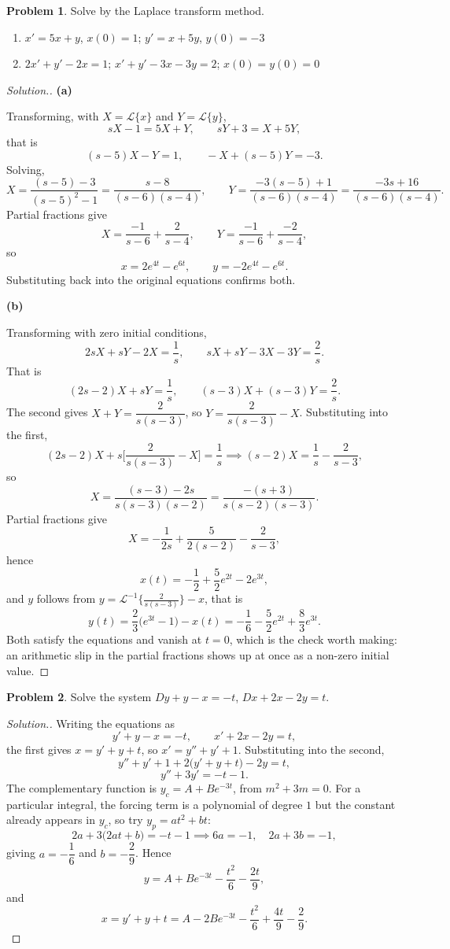 \documentclass[11pt,a4paper]{article}
\theoremstyle{definition}
\newtheorem{problemx}{Problem}[subsection]
\newenvironment{problem}{\begin{problemx}}{\end{problemx}}
\newenvironment{solution}
  {\renewcommand{\qedsymbol}{}\begin{proof}[\textit{Solution}.]}
  {\end{proof}}
\newcommand{\subhead}[1]{%
  \par\medskip\noindent\textbf{#1}\par\nobreak\smallskip}
\begin{document}
\begin{problem}
Solve by the Laplace transform method.
\begin{enumerate}
\item[(a)] $x' = 5x+y$, $x(0)=1$; $y' = x+5y$, $y(0)=-3$
\item[(b)] $2x'+y'-2x = 1$; $x'+y'-3x-3y = 2$; $x(0)=y(0)=0$
\end{enumerate}
\end{problem}
\begin{solution}
\subhead{(a)}
Transforming, with $X = \mathcal{L}\{x\}$ and $Y = \mathcal{L}\{y\}$,
$$sX-1 = 5X+Y,\qquad sY+3 = X+5Y ,$$
that is
$$(s-5)X - Y = 1,\qquad -X + (s-5)Y = -3 .$$
Solving,
$$X = \frac{(s-5)-3}{(s-5)^2-1} = \frac{s-8}{(s-6)(s-4)},\qquad
Y = \frac{-3(s-5)+1}{(s-6)(s-4)} = \frac{-3s+16}{(s-6)(s-4)}.$$
Partial fractions give
$$X = \frac{-1}{s-6} + \frac{2}{s-4},\qquad
Y = \frac{-1}{s-6} + \frac{-2}{s-4},$$
so
$$x = 2e^{4t}-e^{6t},\qquad y = -2e^{4t}-e^{6t}.$$
Substituting back into the original equations confirms both.

\subhead{(b)}
Transforming with zero initial conditions,
$$2sX + sY - 2X = \frac1s,\qquad sX+sY-3X-3Y = \frac2s .$$
That is
$$(2s-2)X + sY = \frac1s,\qquad (s-3)X + (s-3)Y = \frac2s .$$
The second gives $X+Y = \dfrac{2}{s(s-3)}$, so $Y = \dfrac{2}{s(s-3)} - X$.
Substituting into the first,
$$(2s-2)X + s\Big[\frac{2}{s(s-3)}-X\Big] = \frac1s
\implies (s-2)X = \frac1s - \frac{2}{s-3},$$
so
$$X = \frac{(s-3)-2s}{s(s-3)(s-2)} = \frac{-(s+3)}{s(s-2)(s-3)} .$$
Partial fractions give
$$X = -\frac{1}{2s} + \frac{5}{2(s-2)} - \frac{2}{s-3},$$
hence
$$x(t) = -\frac12 + \frac52e^{2t} - 2e^{3t},$$
and $y$ follows from $y = \displaystyle\mathcal{L}^{-1}\Big\{\frac{2}{s(s-3)}\Big\} - x$,
that is
$$y(t) = \frac23\big(e^{3t}-1\big) - x(t)
= -\frac16 - \frac52e^{2t} + \frac83e^{3t}.$$
Both satisfy the equations and vanish at $t=0$, which is the check worth
making: an arithmetic slip in the partial fractions shows up at once as a
non-zero initial value.
\end{solution}

\begin{problem}
Solve the system $Dy+y-x = -t$, $Dx+2x-2y = t$.
\end{problem}
\begin{solution}
Writing the equations as
$$y'+y-x = -t,\qquad x'+2x-2y = t ,$$
the first gives $x = y'+y+t$, so $x' = y''+y'+1$. Substituting into the second,
$$y''+y'+1 + 2\big(y'+y+t\big) - 2y = t ,$$
$$y'' + 3y' = -t - 1 .$$
The complementary function is $y_c = A + Be^{-3t}$, from $m^2+3m = 0$. For a
particular integral, the forcing term is a polynomial of degree $1$ but the
constant already appears in $y_c$, so try $y_p = at^2+bt$:
$$2a + 3\big(2at+b\big) = -t-1 \implies 6a = -1,\quad 2a+3b = -1 ,$$
giving $a = -\dfrac16$ and $b = -\dfrac{2}{9}$. Hence
$$y = A + Be^{-3t} - \frac{t^2}{6} - \frac{2t}{9},$$
and
$$x = y'+y+t = A - 2Be^{-3t} - \frac{t^2}{6} + \frac{4t}{9} - \frac{2}{9}.$$
\end{solution}
\end{document}
